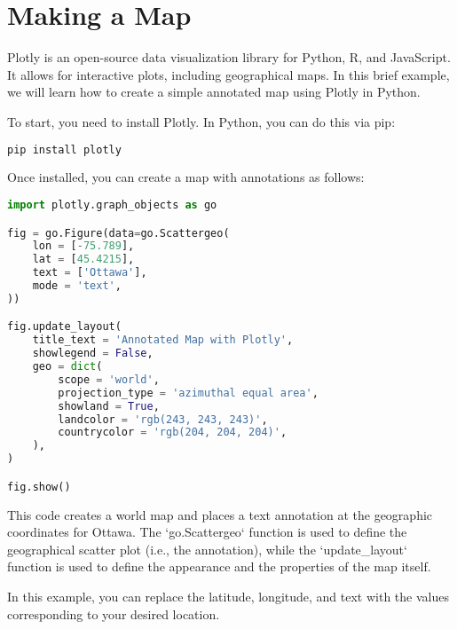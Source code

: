 \chapter{Making a Map}


Plotly is an open-source data visualization library for Python, R, and
JavaScript. It allows for interactive plots, including geographical
maps. In this brief example, we will learn how to create a simple
annotated map using Plotly in Python.

To start, you need to install Plotly. In Python, you can do this via pip:

\begin{lstlisting}[language=Python]
pip install plotly
\end{lstlisting}

Once installed, you can create a map with annotations as follows:

\begin{lstlisting}[language=Python]
import plotly.graph_objects as go

fig = go.Figure(data=go.Scattergeo(
    lon = [-75.789], 
    lat = [45.4215],
    text = ['Ottawa'],
    mode = 'text',
))

fig.update_layout(
    title_text = 'Annotated Map with Plotly',
    showlegend = False,
    geo = dict(
        scope = 'world',
        projection_type = 'azimuthal equal area',
        showland = True,
        landcolor = 'rgb(243, 243, 243)',
        countrycolor = 'rgb(204, 204, 204)',
    ),
)

fig.show()
\end{lstlisting}

This code creates a world map and places a text annotation at the
geographic coordinates for Ottawa. The `go.Scattergeo` function is
used to define the geographical scatter plot (i.e., the annotation),
while the `update\_layout` function is used to define the appearance
and the properties of the map itself.

In this example, you can replace the latitude, longitude, and text
with the values corresponding to your desired location.
